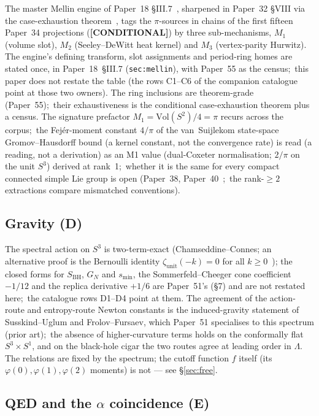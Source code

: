 \documentclass[11pt,a4paper]{article}
\theoremstyle{plain}
\theoremstyle{definition}
\newcommand{\Vol}{\mathrm{Vol}}
\newcommand{\sphere}[1]{S^{#1}}
\begin{document}
The master Mellin engine of Paper~18 \S III.7~\cite{paper18}, sharpened in Paper~32 \S VIII via the case-exhaustion theorem~\cite{paper32}, tags the $\pi$-sources in chains of the first fifteen Paper~34 projections (\textbf{[CONDITIONAL]}) by three sub-mechanisms, $M_1$ (volume slot), $M_2$ (Seeley--DeWitt heat kernel) and $M_3$ (vertex-parity Hurwitz). The engine's defining transform, slot assignments and period-ring homes are stated once, in Paper~18~\S III.7 (\texttt{sec:mellin}), with Paper~55 as the census;\ this paper does not restate the table (the rows C1--C6 of the companion catalogue point at those two owners). The ring inclusions are theorem-grade (Paper~55);\ their exhaustiveness is the conditional case-exhaustion theorem plus a census. The signature prefactor $M_1 = \Vol(\sphere{2})/4 = \pi$ recurs across the corpus;\ the Fej\'er-moment constant $4/\pi$ of the van~Suijlekom state-space Gromov--Hausdorff bound (a kernel constant, not the convergence rate) is read (a reading, not a derivation) as an M1 value (dual-Coxeter normalisation; $2/\pi$ on the unit $S^3$) derived at rank~1;\ whether it is the same for every compact connected simple Lie group is open (Paper~38, Paper~40~\cite{paper38,paper40};\ the rank-$\ge 2$ extractions compare mismatched conventions).

\subsection{Gravity (D)}
\label{sec:forced_gravity}

The spectral action on $\sphere{3}$ is two-term-exact (Chamseddine--Connes; an alternative proof is the Bernoulli identity $\zeta_{\mathrm{unit}}(-k) = 0$ for all $k \ge 0$~\cite{paper51}); the closed forms for $S_{\mathrm{BH}}$, $G_N$ and $s_{\min}$, the Sommerfeld--Cheeger cone coefficient $-1/12$ and the replica derivative $+1/6$ are Paper~51's (\S7) and are not restated here;\ the catalogue rows D1--D4 point at them. The agreement of the action-route and entropy-route Newton constants is the induced-gravity statement of Susskind--Uglum and Frolov--Fursaev, which Paper~51 specialises to this spectrum (prior art);\ the absence of higher-curvature terms holds on the conformally flat $\sphere{3} \times S^1$, and on the black-hole cigar the two routes agree at leading order in $\Lambda$. The relations are fixed by the spectrum; the cutoff function $f$ itself (its $\varphi(0), \varphi(1), \varphi(2)$ moments) is not --- see \S\ref{sec:free}.

\subsection{QED and the $\alpha$ coincidence (E)}
\label{sec:forced_qed}
\end{document}
